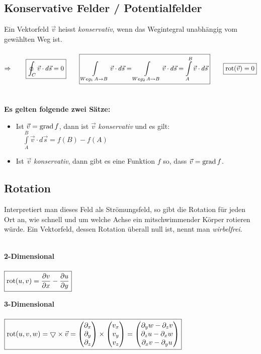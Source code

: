 \subsection{Konservative Felder / Potentialfelder}
Ein Vektorfeld $\vec{v}$ heisst \textit{konservativ}, wenn das Wegintegral
unabhängig vom gewählten Weg ist.\\\\
$\Rightarrow\qquad \boxed{\oint_C \vec{v}\cdot d\vec{s}=0}\qquad\boxed{
\int\limits_{Weg_1\, A\rightarrow B} \vec{v}\cdot d\vec{s}=\int\limits_{Weg_2\,
A\leadsto B} \vec{v}\cdot d\vec{s}=\int\limits_A^B \vec{v}\cdot
d\vec{s}}\qquad\boxed{\operatorname{rot} (\vec{v})=0}$\\\\\\	
\textbf{Es gelten folgende zwei Sätze:}
\begin{itemize}
  \item Ist $\vec{v}=\operatorname{grad} f$, dann ist $\vec{v}$
  \textit{konservativ} und es gilt: $\quad\int\limits_A^B \vec{v}\cdot d\vec{s}=f(B)-f(A)$
  \item Ist $\vec{v}$ \textit{konservativ}, dann gibt es eine Funktion $f$ so,
  dass $\vec{v}=\operatorname{grad} f$.
\end{itemize}

\subsection{Rotation}
Interpretiert man dieses Feld als Strömungsfeld, so gibt die Rotation für jeden
Ort an, wie schnell und um welche Achse ein mitschwimmender Körper rotieren
würde. Ein Vektorfeld, dessen Rotation überall null ist, nennt man
\textit{wirbelfrei}.\\\\
\begin{minipage}{8cm}
	\textbf{2-Dimensional}\\\\
	$\boxed{\operatorname{rot}(u,v)=\frac{\partial v}{\partial x}-\frac{\partial u}{\partial y}}$
\end{minipage}
\begin{minipage}{8cm}
	\textbf{3-Dimensional}\\\\
	$\boxed{\operatorname{rot}(u,v,w)=\bigtriangledown\times
	\vec{v}=
	\begin{pmatrix}
    	\partial_x\\
    	\partial_y\\
    	\partial_z
    \end{pmatrix}\times
	\begin{pmatrix}
    	v_x\\
    	v_y\\
    	v_z
    \end{pmatrix}=
	\begin{pmatrix}
    	\partial_{y} w-\partial_{z} v\\
    	\partial_{z} u-\partial_{x} w\\
    	\partial_{x} v-\partial_{y} u
    \end{pmatrix}}$
\end{minipage} \\

